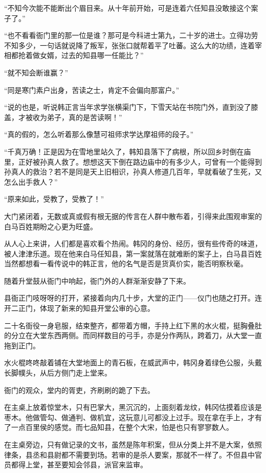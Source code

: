 “不知今次能不能断出个眉目来。从十年前开始，可是连着六任知县没敢接这个案子了。”

“也不看看衙门里的那一位是谁？那可是今科进士第九，二十岁的进士。立得功劳不知多少，一句话就说降了叛军，张张口就帮着平了吐蕃。这么大的功绩，连着宰相都抢着做女婿，过去的知县哪一任能比？”

“就不知会断谁赢？”

“同是寒门素户出身，苦读之士，肯定不会偏向那富户。”

“说的也是，听说韩正言当年求学张横渠门下，下雪天站在书院门外，直到没了膝盖，才被收为弟子，真的是苦读啊！”

“真的假的，怎么听着那么像慧可祖师求学达摩祖师的段子。”

“千真万确！正是因为在雪地里站久了，韩知县落下了病根，所以回乡时倒在庙里，正好被孙真人救了。想想这天下倒在路边庙中的有多少人，可曾有一个能得到孙真人的救治？若不是同是天上旧相识，孙真人修道几百年，早就看破了生死，又怎么出手救人？”

“原来如此，受教了，受教了！”

大门紧闭着，无数或真或假有根无据的传言在人群中散布着，引得来此围观审案的白马百姓期盼之心更为旺盛。

从人心上来讲，人们都是喜欢看个热闹。韩冈的身份、经历，很有些传奇的味道，被人津津乐道。现在他来白马任知县，第一案就落在就难断的案子上，白马县百姓当然都想看一看传说中的韩正言，他的名气是否是货真价实，能否明察秋毫。

随着升堂鼓从衙门中响起，衙门外的人群渐渐安静了下来。

县衙正门吱呀呀的打开，紧接着向内几十步，大堂的正门——仪门也随之打开。连开二正门，体现了新来的知县开堂公审的心意。

二十名衙役一身皂服，结束整齐，都带着方帽，手持上红下黑的水火棍，挺胸叠肚的分立在大堂东西两侧。而同样数目的弓手，亦是分作两队，跨着刀，从大堂一直拖到正门。

水火棍咚咚敲着铺在大堂地面上的青石板，在威武声中，韩冈身着绿色公服，头戴长脚幞头，从后方侧门走上堂来。

衙门的观众，堂内的胥吏，齐刷刷的跪了下去。

在主桌上放着惊堂木，只有巴掌大，黑沉沉的，上面刻着龙纹，韩冈估摸着应该是枣木。他做管勾、做通判、做机宜，这玩意儿可都没上过手。现在拿在手上，才有了一点百里侯的感觉。而七品知县，在整个大宋，怕是也只有寥寥数人。

在主桌旁边，只有做记录的文书，虽然是陈年积案，但从分类上并不是大案，依照律条，县丞和县尉都不需要到场。若审的是杀人要案，那就不一样了。不但县中官员都得上堂，甚至要知会邻县，派官来监审。


